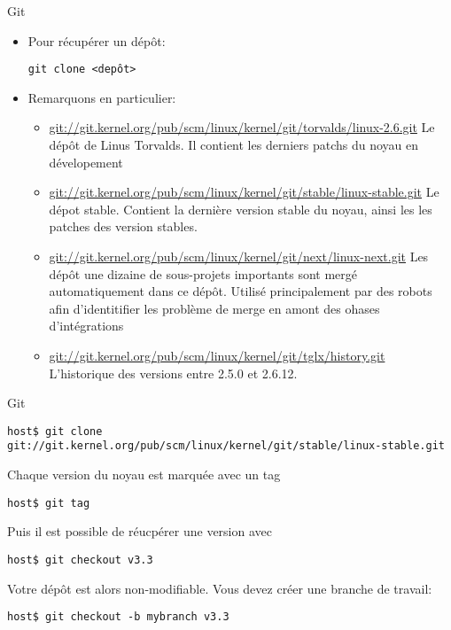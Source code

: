 \begin{frame}[fragile=singleslide]{Git}
  \begin{itemize} 
  \item Pour récupérer un dépôt:
    \begin{lstlisting} 
git clone <depôt>
    \end{lstlisting} 
  \item Remarquons en particulier:
    \begin{itemize} 
    \item
      \url{git://git.kernel.org/pub/scm/linux/kernel/git/torvalds/linux-2.6.git}
      Le dépôt de  Linus Torvalds. Il contient les  derniers patchs du
      noyau en dévelopement
    \item
      \url{git://git.kernel.org/pub/scm/linux/kernel/git/stable/linux-stable.git}
      Le dépot  stable. Contient la dernière version  stable du noyau,
      ainsi les les patches des version stables.
    \item
      \url{git://git.kernel.org/pub/scm/linux/kernel/git/next/linux-next.git}
      Les  dépôt une  dizaine  de sous-projets  importants sont  mergé
      automatiquement dans  ce dépôt.  Utilisé  principalement par des
      robots afin  d'identitifier les problème  de merge en  amont des
      ohases d'intégrations
    \item
      \url{git://git.kernel.org/pub/scm/linux/kernel/git/tglx/history.git}
      L'historique des versions entre 2.5.0 et 2.6.12.
    \end{itemize} 
  \end{itemize}
\end{frame}

\begin{frame}[fragile=singleslide]{Git}
  \begin{lstlisting} 
host$ git clone git://git.kernel.org/pub/scm/linux/kernel/git/stable/linux-stable.git
      \end{lstlisting} 
      Chaque version du noyau est marquée avec un tag
      \begin{lstlisting} 
host$ git tag
      \end{lstlisting} 
      Puis il est possible de réucpérer une version avec
      \begin{lstlisting}
host$ git checkout v3.3
      \end{lstlisting}
      Votre  dépôt  est alors  non-modifiable.  Vous  devez créer  une
      branche de travail:
      \begin{lstlisting}
host$ git checkout -b mybranch v3.3
      \end{lstlisting}
\end{frame}

